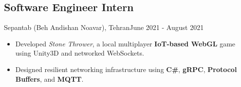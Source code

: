 \subsection{Software Engineer Intern}{Sepantab (Beh Andishan Noavar), Tehran}{June 2021 - August 2021}
\begin{itemize}
    \item Developed \textit{Stone Thrower}, a local multiplayer \textbf{IoT-based WebGL} game using Unity3D and networked WebSockets.
    \item Designed resilient networking infrastructure using \textbf{C\#}, \textbf{gRPC}, \textbf{Protocol Buffers}, and \textbf{MQTT}.
\end{itemize}
